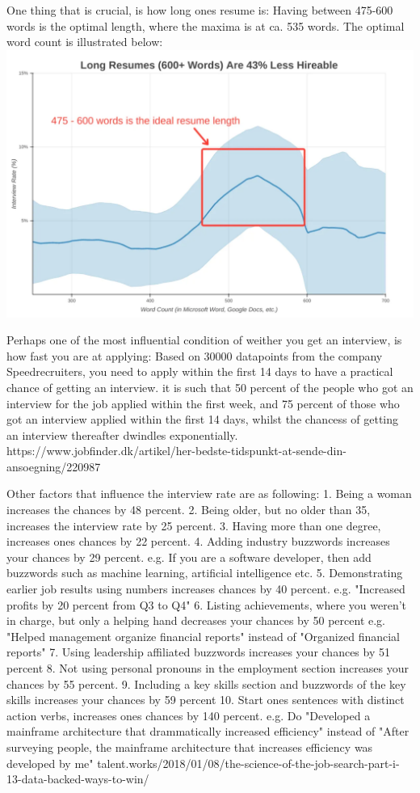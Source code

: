 One thing that is crucial, is how long ones resume is:
Having between 475-600 words is the optimal length, where the maxima is at
ca. 535 words. The optimal word count is illustrated below:
\includegraphics{figures/longresumegraph.png}

Perhaps one of the most influential condition of weither you get an interview,
is how fast you are at applying:
Based on 30000 datapoints from the company Speedrecruiters, you need
to apply within the first 14 days to have a practical chance of getting an
interview. it is such that 50 percent of the people who got an interview
for the job applied within the first week, and 75 percent of those who
got an interview applied within the first 14 days, whilst the chancess of
getting an interview thereafter dwindles exponentially.
https://www.jobfinder.dk/artikel/her-bedste-tidspunkt-at-sende-din-ansoegning/220987

Other factors that influence the interview rate are as following:
1. Being a woman increases the chances by 48 percent.
2. Being older, but no older than 35, increases the interview rate by 25 percent.
3. Having more than one degree, increases ones chances by 22 percent.
4. Adding industry buzzwords increases your chances by 29 percent.
   e.g. If you are a software developer, then add buzzwords such as machine learning,
   artificial intelligence etc.
5. Demonstrating earlier job results using numbers increases chances by 40 percent.
   e.g. "Increased profits by 20 percent from Q3 to Q4"
6. Listing achievements, where you weren't in charge, but only a helping hand
 decreases your chances by 50 percent
   e.g. "Helped management organize financial reports" instead of "Organized financial reports"
7. Using leadership affiliated buzzwords increases your chances by 51 percent
8. Not using personal pronouns in the employment section increases your
chances by 55 percent.
9. Including a key skills section and buzzwords of the key skills increases your
 chances by 59 percent
10. Start ones sentences with distinct action verbs, increases ones chances by 140 percent.
   e.g. Do "Developed a mainframe architecture that drammatically increased efficiency"
   instead of "After surveying people, the mainframe architecture that increases efficiency was
   developed by me"
talent.works/2018/01/08/the-science-of-the-job-search-part-i-13-data-backed-ways-to-win/


